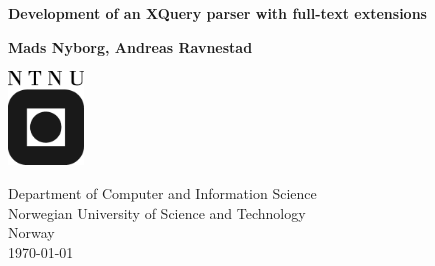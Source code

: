 \newpage

\thispagestyle{empty}
\begin{center}
  \vspace*{1cm}
  {\Huge \bf Development of an XQuery parser with full-text extensions}

  \vspace*{2cm}
  {\LARGE\bf Mads Nyborg, Andreas Ravnestad}

  \vfill

  \vspace*{0.9cm}
  
   \begin{center}
   \includegraphics[width=0.15\textwidth]{img/logo_ntnu}
   \end{center}

  {
	  Department of Computer and Information Science\\
	  Norwegian University of Science and Technology\\
	  Norway\\
	  \today}

\end{center}